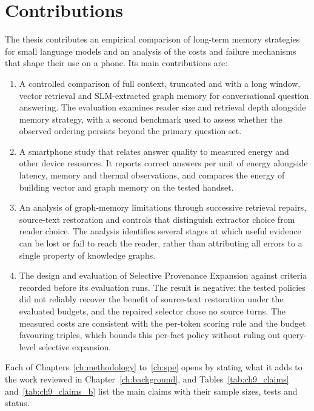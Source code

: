 \section{Contributions}
\label{sec:ch1_contributions}

The thesis contributes an empirical comparison of long-term memory strategies for small
language models and an analysis of the costs and failure mechanisms that shape their
use on a phone. Its main contributions are:

\begin{enumerate}
  \item A controlled comparison of full context, truncated and with a long window, vector retrieval
  and SLM-extracted graph memory for conversational question answering. The evaluation examines
  reader size and retrieval depth alongside memory strategy, with a second benchmark used to
  assess whether the observed ordering persists beyond the primary question set.

  \item A smartphone study that relates answer quality to measured energy and other
  device resources. It reports correct answers per unit of energy alongside latency,
  memory and thermal observations, and compares the energy of building vector and graph
  memory on the tested handset.

  \item An analysis of graph-memory limitations through successive retrieval repairs,
  source-text restoration and controls that distinguish extractor choice from reader
  choice. The analysis identifies several stages at which useful evidence can be
  lost or fail to reach the reader, rather than attributing all errors to a single
  property of knowledge graphs.

  \item The design and evaluation of Selective Provenance Expansion against criteria
  recorded before its evaluation runs. The result is negative: the tested policies did
  not reliably recover the benefit of source-text restoration under the evaluated
  budgets, and the repaired selector chose no source turns. The measured costs are
  consistent with the per-token scoring rule and the budget favouring triples, which bounds
  this per-fact policy without ruling out query-level selective expansion.
\end{enumerate}

Each of Chapters~\ref{ch:methodology} to~\ref{ch:spe} opens by stating what it adds to the work
reviewed in Chapter~\ref{ch:background}, and Tables~\ref{tab:ch9_claims} and~\ref{tab:ch9_claims_b} list the main claims
with their sample sizes, tests and status.

